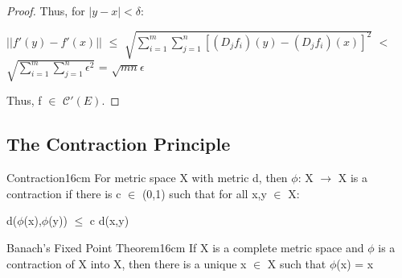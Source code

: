 \begin{proof}
        Thus, for $|y-x| < \delta$:

        \hspace{0.3cm}
        $||f'(y) - f'(x)||$
        $\leq$ $\sqrt{\sum_{i=1}^m \sum_{j=1}^n [(D_jf_i)(y) - (D_jf_i)(x)]^2}$
        $<$ $\sqrt{\sum_{i=1}^m \sum_{j=1}^n \epsilon^2}$
        = $\sqrt{mn}\epsilon$

        Thus, f $\in$ $\mathscr{C}'(E)$.
    \end{proof}

    \newpage





\subsection{ The Contraction Principle }

    \begin{definition}{Contraction}{16cm}
        For metric space X with metric d, then $\phi$: X $\rightarrow$ X
        is a {\color{lblue} contraction} if there is c $\in$ (0,1) such that
        for all x,y $\in$ X:

        \hspace{0.5cm}
        d($\phi$(x),$\phi$(y)) $\leq$ c d(x,y)
    \end{definition}

    \vspace{0.5cm}



    \begin{wtheorem}{Banach's Fixed Point Theorem}{16cm}
        If X is a complete metric space and $\phi$ is a contraction
        of X into X, then there is a unique x $\in$ X
        such that $\phi$(x) = x
    \end{wtheorem}

